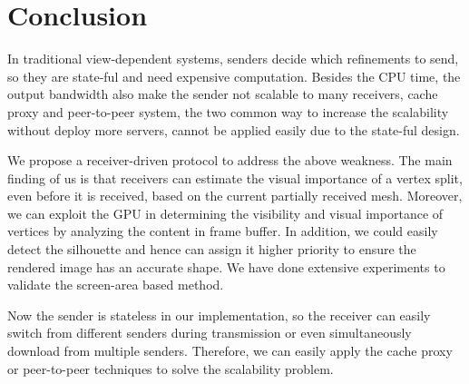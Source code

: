 \section{Conclusion}
\label{s:dstream:conclude}
In traditional view-dependent systems,
senders decide which refinements to send, so they are
state-ful and need expensive computation. %
Besides the CPU time,
the output bandwidth also make the sender not scalable to many receivers,
cache proxy and peer-to-peer system, the two common way to increase the scalability
without deploy more servers, cannot be applied easily due to the state-ful design.

We propose a receiver-driven protocol to address the above weakness.
The main finding of us is that %
receivers can estimate the visual importance of a vertex split, even before
it is received, based on the current partially received mesh. 
Moreover, we can exploit the GPU
in determining the visibility and visual importance of vertices by
analyzing the content in frame buffer. 
In addition, we could easily detect the silhouette and hence can 
assign it higher priority to ensure the rendered image has an accurate shape.
We have done extensive experiments to validate the screen-area based method.

Now the sender is stateless in our implementation, so the receiver can easily
switch from different senders during transmission or even simultaneously
download from multiple senders. Therefore, we can easily apply
the cache proxy or peer-to-peer techniques to solve the scalability problem. 

